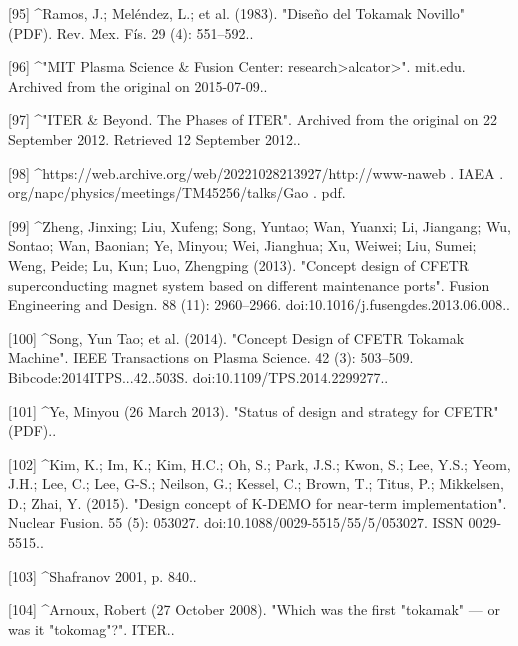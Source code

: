 [95]
^Ramos, J.; Meléndez, L.; et al. (1983). "Diseño del Tokamak Novillo" (PDF). Rev. Mex. Fís. 29 (4): 551–592..

[96]
^"MIT Plasma Science & Fusion Center: research>alcator>". mit.edu. Archived from the original on 2015-07-09..

[97]
^"ITER & Beyond. The Phases of ITER". Archived from the original on 22 September 2012. Retrieved 12 September 2012..

[98]
^https://web.archive.org/web/20221028213927/http://www-naweb . IAEA . org/napc/physics/meetings/TM45256/talks/Gao . pdf.

[99]
^Zheng, Jinxing; Liu, Xufeng; Song, Yuntao; Wan, Yuanxi; Li, Jiangang; Wu, Sontao; Wan, Baonian; Ye, Minyou; Wei, Jianghua; Xu, Weiwei; Liu, Sumei; Weng, Peide; Lu, Kun; Luo, Zhengping (2013). "Concept design of CFETR superconducting magnet system based on different maintenance ports". Fusion Engineering and Design. 88 (11): 2960–2966. doi:10.1016/j.fusengdes.2013.06.008..

[100]
^Song, Yun Tao; et al. (2014). "Concept Design of CFETR Tokamak Machine". IEEE Transactions on Plasma Science. 42 (3): 503–509. Bibcode:2014ITPS...42..503S. doi:10.1109/TPS.2014.2299277..

[101]
^Ye, Minyou (26 March 2013). "Status of design and strategy for CFETR" (PDF)..

[102]
^Kim, K.; Im, K.; Kim, H.C.; Oh, S.; Park, J.S.; Kwon, S.; Lee, Y.S.; Yeom, J.H.; Lee, C.; Lee, G-S.; Neilson, G.; Kessel, C.; Brown, T.; Titus, P.; Mikkelsen, D.; Zhai, Y. (2015). "Design concept of K-DEMO for near-term implementation". Nuclear Fusion. 55 (5): 053027. doi:10.1088/0029-5515/55/5/053027. ISSN 0029-5515..

[103]
^Shafranov 2001, p. 840..

[104]
^Arnoux, Robert (27 October 2008). "Which was the first "tokamak" — or was it "tokomag"?". ITER..